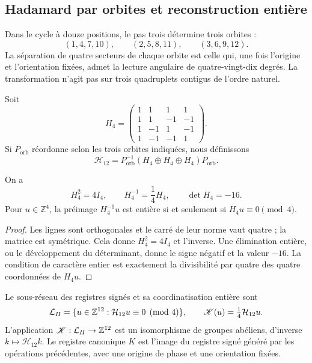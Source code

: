 \subsection{Hadamard par orbites et reconstruction entière}
\label{subsec:k-hadamard}

Dans le cycle à douze positions, le pas trois détermine trois orbites :
\[
 (1,4,7,10),\qquad(2,5,8,11),\qquad(3,6,9,12).
\]
La séparation de quatre secteurs de chaque orbite est celle qui, une fois
l'origine et l'orientation fixées, admet la lecture angulaire de quatre-vingt-dix degrés. La
transformation n'agit pas sur trois quadruplets contigus de l'ordre naturel.

Soit
\[
 H_4=\begin{pmatrix}
 1&1&1&1\\1&1&-1&-1\\1&-1&1&-1\\1&-1&-1&1
 \end{pmatrix}.
\]
Si \(P_{\mathrm{orb}}\) réordonne selon les trois orbites indiquées, nous définissons
\[
 \mathcal H_{12}=P_{\mathrm{orb}}^{-1}
 (H_4\oplus H_4\oplus H_4)P_{\mathrm{orb}}.
\]

\begin{lemma}
\label{lem:k-hadamard}
On a
\[
 H_4^2=4I_4,\qquad H_4^{-1}=\frac14H_4,\qquad\det H_4=-16.
\]
Pour \(u\in\mathbb Z^4\), la préimage \(H_4^{-1}u\) est entière si et
seulement si \(H_4u\equiv0\pmod4\).
\end{lemma}

\begin{proof}
Les lignes sont orthogonales et le carré de leur norme vaut quatre ; la matrice est symétrique. Cela donne \(H_4^2=4I_4\) et l'inverse. Une élimination entière, ou le développement du déterminant, donne le signe négatif et la valeur \(-16\). La condition de caractère entier est exactement la divisibilité par quatre des quatre coordonnées de \(H_4u\).
\end{proof}

\begin{definition}
Le sous-réseau des registres signés et sa coordinatisation entière sont
\[
 \mathcal L_H=\{u\in\mathbb Z^{12}:\mathcal H_{12}u\equiv0\pmod4\},
 \qquad \mathscr K(u)=\tfrac14\mathcal H_{12}u.
\]
L'application \(\mathscr K:\mathcal L_H\to\mathbb Z^{12}\) est un isomorphisme
de groupes abéliens, d'inverse \(k\mapsto\mathcal H_{12}k\).
Le registre canonique \(K\) est l'image du registre signé généré
par les opérations précédentes, avec une origine de phase et une orientation fixées.
\end{definition}

